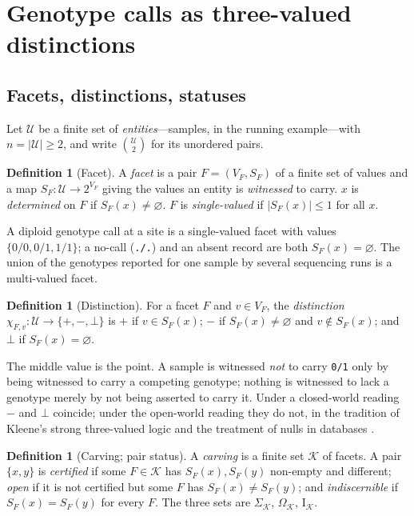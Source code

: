 \documentclass[11pt,twocolumn,a4paper]{article}
\theoremstyle{plain}
\theoremstyle{definition}
\newtheorem{definition}[theorem]{Definition}
\theoremstyle{remark}
\newcommand{\U}{\mathcal{U}}
\newcommand{\Kc}{\mathcal{K}}
\newcommand{\Sig}{\Sigma}
\newcommand{\Opn}{\Omega}
\newcommand{\Ind}{\mathrm{I}}
\newcommand{\cp}{\mathord{+}}
\newcommand{\cm}{\mathord{-}}
\newcommand{\cz}{\mathord{\bot}}
\begin{document}
\section{Genotype calls as three-valued distinctions}
\label{sec:calls}

\subsection{Facets, distinctions, statuses}

Let $\U$ be a finite set of \emph{entities}---samples, in the running
example---with $n=|\U|\ge2$, and write $\binom{\U}{2}$ for its unordered pairs.

\begin{definition}[Facet]
\label{def:facet}
A \emph{facet} is a pair $F=(V_F,S_F)$ of a finite set of values and a map
$S_F:\U\to2^{V_F}$ giving the values an entity is \emph{witnessed} to carry.
$x$ is \emph{determined} on $F$ if $S_F(x)\ne\varnothing$. $F$ is
\emph{single-valued} if $|S_F(x)|\le1$ for all $x$.
\end{definition}

A diploid genotype call at a site is a single-valued facet with values
$\{0/0,0/1,1/1\}$; a no-call (\texttt{./.}) and an absent record are both
$S_F(x)=\varnothing$. The union of the genotypes reported for one sample by
several sequencing runs is a multi-valued facet.

\begin{definition}[Distinction]
\label{def:distinction}
For a facet $F$ and $v\in V_F$, the \emph{distinction}
$\chi_{F,v}:\U\to\{\cp,\cm,\cz\}$ is $\cp$ if $v\in S_F(x)$; $\cm$ if
$S_F(x)\ne\varnothing$ and $v\notin S_F(x)$; and $\cz$ if
$S_F(x)=\varnothing$.
\end{definition}

The middle value is the point. A sample is witnessed \emph{not} to carry
\texttt{0/1} only by being witnessed to carry a competing genotype;
nothing is witnessed to lack a genotype merely by not being asserted to carry
it. Under a closed-world reading \citep{reiter1978} $\cm$ and $\cz$ coincide;
under the open-world reading they do not, in the tradition of Kleene's strong
three-valued logic and the treatment of nulls in databases
\citep{kleene1952,codd1979,imielinski1984,libkin2016}.

\begin{definition}[Carving; pair status]
\label{def:status}
A \emph{carving} is a finite set $\Kc$ of facets. A pair $\{x,y\}$ is
\emph{certified} if some $F\in\Kc$ has $S_F(x),S_F(y)$ non-empty and
different; \emph{open} if it is not certified but some $F$ has
$S_F(x)\ne S_F(y)$; and \emph{indiscernible} if $S_F(x)=S_F(y)$ for every
$F$. The three sets are $\Sig_\Kc$, $\Opn_\Kc$, $\Ind_\Kc$.
\end{definition}
\end{document}
